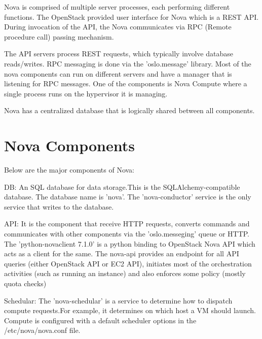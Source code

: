 \documentclass[9pt,twocolumn,twoside]{styles/osajnl}
\begin{document}
Nova is comprised of multiple server processes, each performing different functions. The OpenStack provided user interface for Nova which is a REST API. During invocation of the API, the Nova communicates via  RPC (Remote procedure call) passing mechanism.

The API servers process REST requests, which typically involve database reads/writes. RPC messaging is done via the 'oslo.message' library. Most of the nova components can run on different servers and have a manager that is listening for RPC messages. One of the components is Nova Compute where a single process runs on the hypervisor it is managing.

Nova has a centralized database that is logically  shared between all components\cite{www-nova-pepple}.


\section{Nova Components}

Below are the major components of Nova:


\begin{flushleft}


DB: An SQL database for data storage.This is the SQLAlchemy-compatible database. The database name is 'nova'. The 'nova-conductor' service is the only service that writes to the database. 
\end{flushleft}

\begin{flushleft}
\item API: It is the component that receive HTTP requests, converts commands and communicates with other components via the 'oslo.messeging' queue or HTTP.
The 'python-novaclient 7.1.0' is a python binding to OpenStack Nova API which acts as a client for the same. The nova-api provides an endpoint for all API queries (either OpenStack API or EC2 API), initiates most of the orchestration activities (such as running an instance) and also enforces some policy (mostly quota checks)
\end{flushleft}

\begin{flushleft}

Schedular: The 'nova-schedular' is a service to determine how to dispatch compute requests.For example, it determines on which host a VM should launch. Compute is configured with a default scheduler options in the /etc/nova/nova.conf file\cite{www-nova-schedular}.
\end{flushleft}
\end{document}
